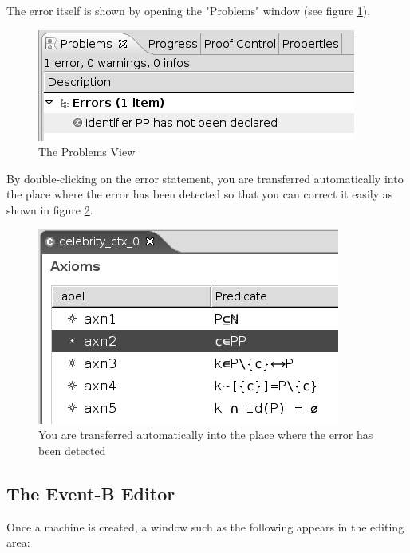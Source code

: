 The error itself is shown by opening the "Problems" window (see figure \ref{fig_ref_01_problemsview2}). 

\begin{figure}[!h]
\begin{center}
	\includegraphics{img/reference/ref_01_problemsview2.png}
	\caption{The Problems View}
	\label{fig_ref_01_problemsview2}
\end{center}
\end{figure}

By double-clicking on the error statement, you are transferred automatically into the place where the error has been detected so that you can correct it easily as shown in figure \ref{fig_ref_01_problemsview3}. 

\begin{figure}[!h]
\begin{center}
	\includegraphics{img/reference/ref_01_problemsview3.png}
	\caption{You are transferred automatically into the place where the error has been detected}
	\label{fig_ref_01_problemsview3}
\end{center}
\end{figure}

\subsection{The Event-B Editor}

Once a machine is created, a window such as the following appears in the editing area: 

